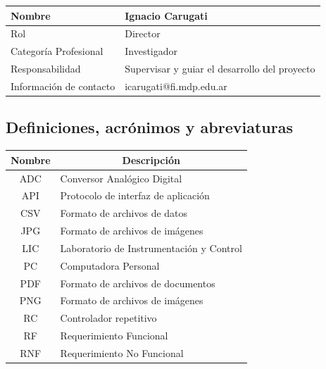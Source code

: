 \documentclass[titlepage, 12pt]{article}
\begin{document}
  \begin{table}[!hbtp]
    \centering
    \begin{tabularx}{\textwidth}{| >{\columncolor[HTML]{C0C0C0}}l |X|}
      \hline
      Nombre                  & Ignacio Carugati        \\ \hline
      Rol                     & Director                \\ \hline
      Categoría Profesional   & Investigador            \\ \hline
      Responsabilidad         & Supervisar y guiar el desarrollo del proyecto \\ \hline
      Información de contacto & icarugati@fi.mdp.edu.ar \\ \hline
    \end{tabularx}
  \end{table}

  \subsection{Definiciones, acrónimos y abreviaturas}
  \begin{table}[H]
    \centering
    \begin{tabular}{|c|l|}
    \hline
      \rowcolor[HTML]{C0C0C0}
      Nombre & \multicolumn{1}{c|}{\cellcolor[HTML]{C0C0C0}Descripción} \\ \hline
      ADC    & Conversor Analógico Digital                              \\ \hline
      API    & Protocolo de interfaz de aplicación                      \\ \hline
      CSV    & Formato de archivos de datos                             \\ \hline
      JPG    & Formato de archivos de imágenes                          \\ \hline
      LIC    & Laboratorio de Instrumentación y Control                 \\ \hline
      PC     & Computadora Personal                                     \\ \hline
      PDF    & Formato de archivos de documentos                        \\ \hline
      PNG    & Formato de archivos de imágenes                          \\ \hline
      RC     & Controlador repetitivo                                   \\ \hline
      RF     & Requerimiento Funcional                                  \\ \hline
      RNF    & Requerimiento No Funcional                               \\ \hline
    \end{tabular}
  \end{table}
\end{document}
